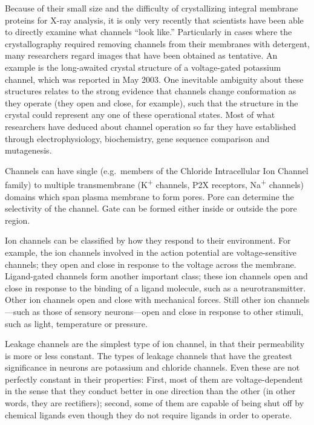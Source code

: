 Because of their small size and the difficulty of crystallizing integral membrane proteins for X-ray analysis, it is only very recently that scientists have been able to directly examine what channels ``look like.'' Particularly in cases where the crystallography required removing channels from their membranes with detergent, many researchers regard images that have been obtained as tentative. An example is the long-awaited crystal structure of a voltage-gated potassium channel, which was reported in May 2003. One inevitable ambiguity about these structures relates to the strong evidence that channels change conformation as they operate (they open and close, for example), such that the structure in the crystal could represent any one of these operational states. Most of what researchers have deduced about channel operation so far they have established through electrophysiology, biochemistry, gene sequence comparison and mutagenesis.

Channels can have single (e.g.~members of the Chloride Intracellular Ion Channel family) to multiple transmembrane (K\textsuperscript{+} channels, P2X receptors, Na\textsuperscript{+} channels) domains which span plasma membrane to form pores. Pore can determine the selectivity of the channel. Gate can be formed either inside or outside the pore region.

Ion channels can be classified by how they respond to their environment. For example, the ion channels involved in the action potential are voltage-sensitive channels; they open and close in response to the voltage across the membrane. Ligand-gated channels form another important class; these ion channels open and close in response to the binding of a ligand molecule, such as a neurotransmitter. Other ion channels open and close with mechanical forces. Still other ion channels---such as those of sensory neurons---open and close in response to other stimuli, such as light, temperature or pressure.

Leakage channels are the simplest type of ion channel, in that their permeability is more or less constant. The types of leakage channels that have the greatest significance in neurons are potassium and chloride channels. Even these are not perfectly constant in their properties: First, most of them are voltage-dependent in the sense that they conduct better in one direction than the other (in other words, they are rectifiers); second, some of them are capable of being shut off by chemical ligands even though they do not require ligands in order to operate.

